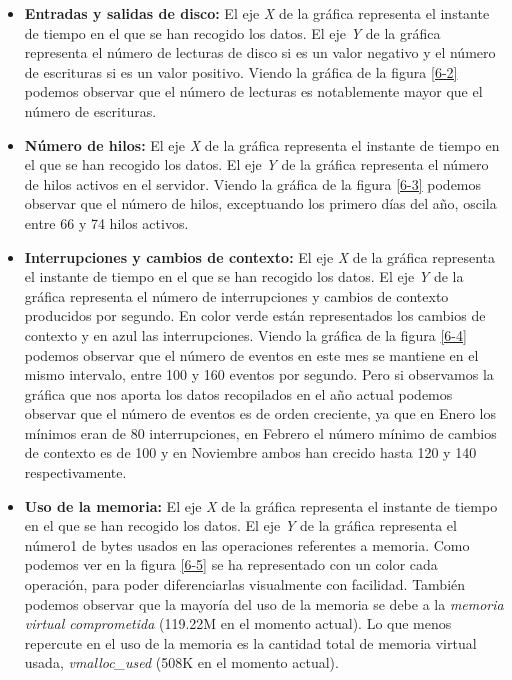 \documentclass[a4paper,titlepage,12pt]{scrartcl}	%
\numberwithin{figure}{section} %
\numberwithin{table}{section} %
\begin{document}
	\begin{itemize}
		\item \textbf{Entradas y salidas de disco:} El eje \textit{X} de la gráfica representa el instante de tiempo en el que se han recogido los datos. El eje \textit{Y} de la gráfica representa el número de lecturas de disco si es un valor negativo y el número de escrituras si es un valor positivo. Viendo la gráfica de la figura \ref{6-2} podemos observar que el número de lecturas es notablemente mayor que el número de escrituras.
		\item \textbf{Número de hilos:} El eje \textit{X} de la gráfica representa el instante de tiempo en el que se han recogido los datos. El eje \textit{Y} de la gráfica representa el número de hilos activos en el servidor. Viendo la gráfica de la figura \ref{6-3} podemos observar que el número de hilos, exceptuando los primero días del año, oscila entre 66 y 74 hilos activos.
		\item \textbf{Interrupciones y cambios de contexto:} El eje \textit{X} de la gráfica representa el instante de tiempo en el que se han recogido los datos. El eje \textit{Y} de la gráfica representa el número de interrupciones y cambios de contexto producidos por segundo. En color verde están representados los cambios de contexto y en azul las interrupciones. Viendo la gráfica de la figura \ref{6-4} podemos observar que el número de eventos en este mes se mantiene en el mismo intervalo, entre 100 y 160 eventos por segundo. Pero si observamos la gráfica que nos aporta los datos recopilados en el año actual podemos observar que el número de eventos es de orden creciente, ya que en Enero los mínimos eran de 80 interrupciones, en Febrero el número mínimo de cambios de contexto es de 100 y en Noviembre ambos han crecido hasta 120 y 140 respectivamente.
		\item \textbf{Uso de la memoria:} El eje \textit{X} de la gráfica representa el instante de tiempo en el que se han recogido los datos. El eje \textit{Y} de la gráfica representa el número1 de bytes usados en las operaciones referentes a memoria. Como podemos ver en la figura \ref{6-5} se ha representado con un color cada operación, para poder diferenciarlas visualmente con facilidad. También podemos observar que la mayoría del uso de la memoria se debe a la \textit{memoria virtual comprometida} (119.22M en el momento actual). Lo que menos repercute en el uso de la memoria es la cantidad total de memoria virtual usada, \textit{vmalloc\_used} (508K en el momento actual).
	\end{itemize}
	
\end{document}
